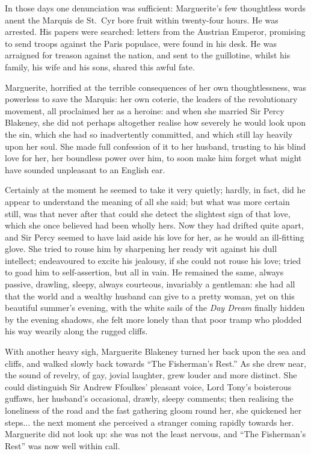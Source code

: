 \documentclass[paper=5.5in:8.5in,BCOR=7mm,twoside,DIV=calc,12pt,usegeometry,chapterprefix,endperiod,headings=big]{scrbook}
\begin{document}
In those days one denunciation was sufficient: Marguerite's few thoughtless words anent the Marquis de St.~Cyr bore fruit within twenty-four hours. He was arrested. His papers were searched: letters from the Austrian Emperor, promising to send troops against the Paris populace, were found in his desk. He was arraigned for treason against the nation, and sent to the guillotine, whilst his family, his wife and his sons, shared this awful fate.

Marguerite, horrified at the terrible consequences of her own thoughtlessness, was powerless to save the Marquis: her own coterie, the leaders of the revolutionary movement, all proclaimed her as a heroine: and when she married Sir Percy Blakeney, she did not perhaps altogether realise how severely he would look upon the sin, which she had so inadvertently committed, and which still lay heavily upon her soul. She made full confession of it to her husband, trusting to his blind love for her, her boundless power over him, to soon make him forget what might have sounded unpleasant to an English ear.

Certainly at the moment he seemed to take it very quietly; hardly, in fact, did he appear to understand the meaning of all she said; but what was more certain still, was that never after that could she detect the slightest sign of that love, which she once believed had been wholly hers. Now they had drifted quite apart, and Sir Percy seemed to have laid aside his love for her, as he would an ill-fitting glove. She tried to rouse him by sharpening her ready wit against his dull intellect; endeavoured to excite his jealousy, if she could not rouse his love; tried to goad him to self-assertion, but all in vain. He remained the same, always passive, drawling, sleepy, always courteous, invariably a gentleman: she had all that the world and a wealthy husband can give to a pretty woman, yet on this beautiful summer's evening, with the white sails of the \textit{Day Dream} finally hidden by the evening shadows, she felt more lonely than that poor tramp who plodded his way wearily along the rugged cliffs.

With another heavy sigh, Marguerite Blakeney turned her back upon the sea and cliffs, and walked slowly back towards \enquote{The Fisherman's Rest.} As she drew near, the sound of revelry, of gay, jovial laughter, grew louder and more distinct. She could distinguish Sir Andrew Ffoulkes’ pleasant voice, Lord Tony's boisterous guffaws, her husband's occasional, drawly, sleepy comments; then realising the loneliness of the road and the fast gathering gloom round her, she quickened her steps... the next moment she perceived a stranger coming rapidly towards her. Marguerite did not look up: she was not the least nervous, and \enquote{The Fisherman's Rest} was now well within call.
\end{document}
